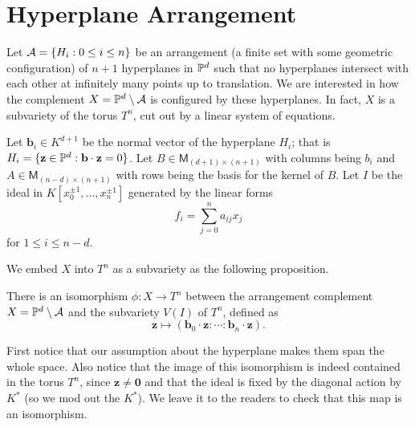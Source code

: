\section{Hyperplane Arrangement} 
\label{sec:hyperplane-arrangement}
	Let $\cala = \{H_i: 0 \le i \le n\}$ 
	be an arrangement 
	(a finite set with some geometric configuration) of $n+1$ 
	hyperplanes in $\P^d$
	such that no hyperplanes intersect 
	with each other at infinitely many points up to translation.
	We are interested in how the complement $X = \P^d \setminus \cala$ 	is configured by these hyperplanes. 
	In fact, $X$ is a subvariety of the torus $T^n$,
	cut out by a linear system of equations.

	Let $\mathbf{b}_i \in K^{d+1}$ be the normal vector of 
	the hyperplane $H_i$;
	that is $H_i = \{\mathbf{z} \in \P^d: \mathbf{b} \cdot \mathbf{z} = 0\}$.
	Let $B \in \mathsf{M}_{(d+1)\times (n+1)}$ 
	with columns being $b_i$ 
	and $A \in \mathsf{M}_{(n-d)\times (n+1)}$ 
	with rows being the basis for the kernel of $B$.
	Let $I$ be the ideal in $K[x_0^{\pm 1}, \ldots, x_n^{\pm 1}]$ 
	generated by the linear forms 
	\[
	f_i = \sum\limits_{j = 0}^{n} a_{ij} x_j
	\] for $1 \le i \le n-d$.
	
	We embed $X$ into $T^n$ as a subvariety 
	as the following proposition.
	
		\begin{proposition}
			There is an isomorphism $\phi: X \rightarrow T^n$ 
			between 
			the arrangement complement $X = \P^d \setminus \cala$ 
			and the subvariety $V(I)$ of $T^n$,
			defined as 
			\[
			\mathbf{z} \mapsto (\mathbf{b}_0 \cdot \mathbf{z}:
			\cdots: \mathbf{b}_n \cdot \mathbf{z}).
			\]
		\end{proposition}
	First notice that our assumption about the hyperplane 
	makes them span the whole space.
	Also notice that the image of this isomorphism 
	is indeed contained in the torus $T^n$,
	since $\mathbf{z} \ne \mathbf{0}$
	and that the ideal is fixed by the diagonal action by $K^\ast$
	(so we mod out the $K^\ast$). 
	We leave it to the readers to check that 
	this map is an isomorphism.
	
